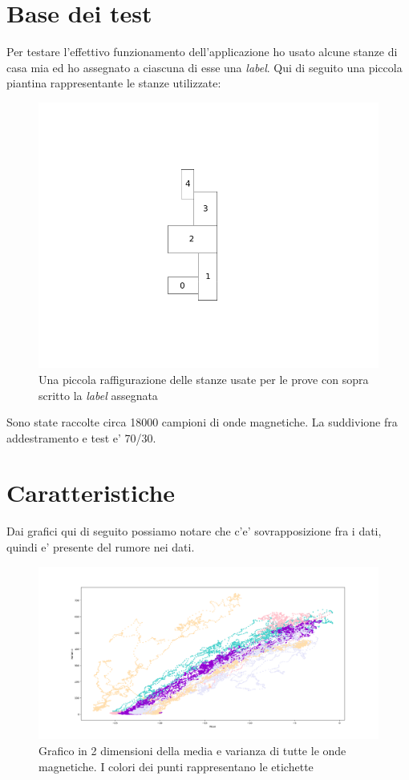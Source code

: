 \section*{Base dei test}
Per testare l'effettivo funzionamento dell'applicazione ho usato alcune stanze di casa mia ed ho assegnato a ciascuna di esse una \textit{label}. Qui di seguito una piccola piantina rappresentante le stanze utilizzate:

\begin{figure}[H]
\centering
\includegraphics[width=0.7\linewidth]{img/test_pianta_casa}
\caption{Una piccola raffigurazione delle stanze usate per le prove con sopra scritto la \textit{label} assegnata}
\label{fig:test_pianta_casa}
\end{figure}

Sono state raccolte circa 18000 campioni di onde magnetiche. La suddivione fra addestramento e test e' 70/30.

\section{Caratteristiche}
Dai grafici qui di seguito possiamo notare che c'e' sovrapposizione fra i dati, quindi e' presente del rumore nei dati.
\begin{figure}[H]
	\centering
	\includegraphics[width=1\linewidth]{img/plot_features}
	\caption{Grafico in 2 dimensioni della media e varianza di tutte le onde magnetiche. I colori dei punti rappresentano le etichette}
	\label{fig:plotfeatures}
\end{figure}

